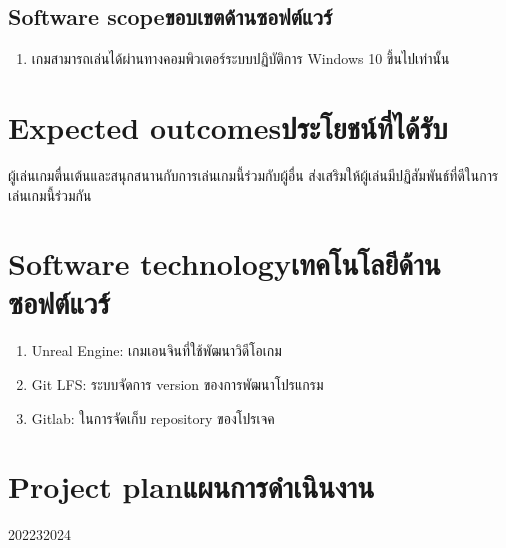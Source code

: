 \subsection{\ifenglish Software scope\else ขอบเขตด้านซอฟต์แวร์\fi}
\begin{enumerate}
    \item เกมสามารถเล่นได้ผ่านทางคอมพิวเตอร์ระบบปฏิบัติการ Windows 10 ขึ้นไปเท่านั้น
\end{enumerate}

\section{\ifenglish Expected outcomes\else ประโยชน์ที่ได้รับ\fi}

ผู้เล่นเกมตื่นเต้นและสนุกสนานกับการเล่นเกมนี้ร่วมกับผู้อื่น ส่งเสริมให้ผู้เล่นมีปฏิสัมพันธ์ที่ดีในการเล่นเกมนี้ร่วมกัน

\section{\ifenglish Software technology\else เทคโนโลยีด้านซอฟต์แวร์\fi}
\begin{enumerate}
    \item Unreal Engine: เกมเอนจินที่ใช้พัฒนาวิดีโอเกม
    \item Git LFS: ระบบจัดการ version ของการพัฒนาโปรแกรม
    \item Gitlab: ในการจัดเก็บ repository ของโปรเจค

\end{enumerate}

\section{\ifenglish Project plan\else แผนการดำเนินงาน\fi}

\begin{plan}{12}{2022}{3}{2024}
\end{plan}

